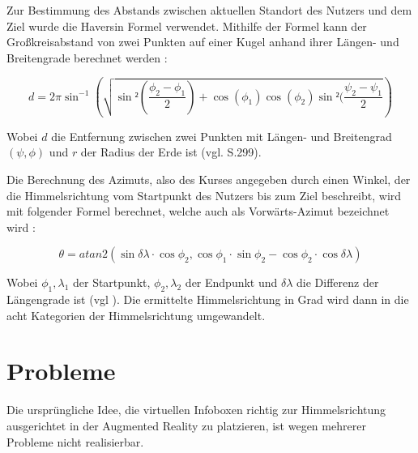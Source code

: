 Zur Bestimmung des Abstands zwischen aktuellen Standort des Nutzers und dem Ziel wurde die Haversin Formel verwendet. Mithilfe der Formel kann der Großkreisabstand von zwei Punkten auf einer Kugel anhand ihrer Längen- und Breitengrade berechnet werden \cite{haversine}: 

\begin{equation}
d = 2 \pi \sin^{-1} (\sqrt{\sin²(\frac{\phi_2 - \phi_1}{2})+\cos(\phi_1)\cos(\phi_2)\sin²(\frac{\psi_2-\psi_1}{2}})
\end{equation}

Wobei $d$ die Entfernung zwischen zwei Punkten mit Längen- und Breitengrad $(\psi,\phi)$ und $r$ der Radius der Erde ist (vgl. \cite{haversine} S.299).

Die Berechnung des Azimuts, also des Kurses angegeben durch einen Winkel, der die Himmelsrichtung vom Startpunkt des Nutzers bis zum Ziel beschreibt, wird mit folgender Formel berechnet, welche auch als \glqq Vorwärts-Azimut\grqq{} bezeichnet wird \cite{bearing}:

\begin{equation}
\theta = atan2(\sin \delta\lambda \cdot\cos\phi_2, \cos \phi_1 \cdot\sin\phi_2 - \cos\phi_2 \cdot\cos\delta\lambda)
\end{equation}

Wobei $\phi_1,\lambda_1$ der Startpunkt, $\phi_2,\lambda_2$ der Endpunkt und $\delta\lambda$   die Differenz der Längengrade ist (vgl \cite{bearing}). Die ermittelte Himmelsrichtung in Grad wird dann in die acht Kategorien der Himmelsrichtung umgewandelt.

\section{Probleme}

Die ursprüngliche Idee, die virtuellen Infoboxen richtig zur Himmelsrichtung ausgerichtet in der Augmented Reality zu platzieren, ist wegen mehrerer Probleme nicht realisierbar.

